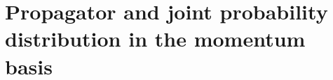 \chapter{Propagator and joint probability distribution in the momentum basis}
\label{sec:perturbation_series_momentum}